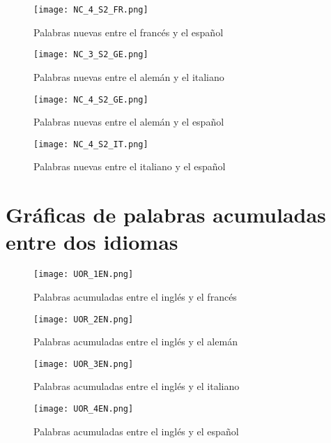 \begin{figure}%
	\centering
	\texttt{[image: NC\_4\_S2\_FR.png]}
	\label{fig.NC_FS}
	\caption{Palabras nuevas entre el francés y el español}
\end{figure}

\begin{figure}%
	\centering
	\texttt{[image: NC\_3\_S2\_GE.png]}
	\label{fig.NC_GI}
	\caption{Palabras nuevas entre el alemán y el italiano}
\end{figure}

\begin{figure}%
	\centering
	\texttt{[image: NC\_4\_S2\_GE.png]}
	\label{fig.NC_GS}
	\caption{Palabras nuevas entre el alemán y el español}
\end{figure}

\begin{figure}%
	\centering
	\texttt{[image: NC\_4\_S2\_IT.png]}
	\label{fig.NC_IS}
	\caption{Palabras nuevas entre el italiano y el español}
\end{figure}





\clearpage



\section{Gráficas de palabras acumuladas entre dos idiomas}
\label{palabras.acumuladas.apendice}

\begin{figure}[h!]
	\centering
	\texttt{[image: UOR\_1EN.png]}
	\label{fig.SF_EF}
	\caption{Palabras acumuladas entre el inglés y el francés}
\end{figure}


\begin{figure}[h!]
	\centering
	\texttt{[image: UOR\_2EN.png]}
	\label{fig.SF_EG}
	\caption{Palabras acumuladas entre el inglés y el alemán}
\end{figure}


\begin{figure}[h!]
	\centering
	\texttt{[image: UOR\_3EN.png]}
	\label{fig.SF_EI}
	\caption{Palabras acumuladas entre el inglés y el italiano}
\end{figure}

\begin{figure}[h!]
	\centering
	\texttt{[image: UOR\_4EN.png]}
	\label{fig.SF_ES}
	\caption{Palabras acumuladas entre el inglés y el español}
\end{figure}

